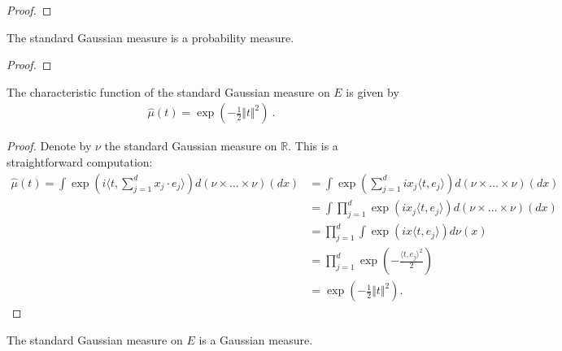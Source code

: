 \begin{proof}\leanok

\end{proof}


\begin{lemma}\label{lem:isProbabilityMeasure_stdGaussian}
  \leanok
The standard Gaussian measure is a probability measure.
\end{lemma}

\begin{proof}\leanok

\end{proof}


\begin{lemma}\label{lem:charFun_stdGaussian}
  \leanok
The characteristic function of the standard Gaussian measure on $E$ is given by
\begin{align*}
  \hat{\mu}(t) = \exp\left(-\frac{1}{2} \Vert t \Vert^2 \right) \: .
\end{align*}
\end{lemma}

\begin{proof}\leanok
Denote by $\nu$ the standard Gaussian measure on $\mathbb{R}$. This is a straightforward computation:
\begin{align*}
  \hat{\mu}(t) = \int \exp\left(i\langle t, \sum_{j=1}^d x_j \cdot e_j \rangle\right) d(\nu \times \ldots \times \nu)(dx) &= \int \exp\left(\sum_{j=1}^d ix_j\langle t, e_j \rangle\right) d(\nu \times \ldots \times \nu)(dx) \\
  &= \int \prod_{j=1}^d \exp\left(ix_j\langle t, e_j \rangle\right) d(\nu \times \ldots \times \nu)(dx) \\
  &= \prod_{j=1}^d \int \exp\left(ix\langle t, e_j \rangle\right) d\nu(x) \\
  &= \prod_{j=1}^d \exp\left(-\frac{\langle t, e_j \rangle^2}{2}\right) \\
  &= \exp\left(-\frac{1}{2} \Vert t \Vert^2 \right).
\end{align*}
\end{proof}


\begin{lemma}\label{lem:isGaussian_stdGaussian}
  \leanok
The standard Gaussian measure on $E$ is a Gaussian measure.
\end{lemma}

